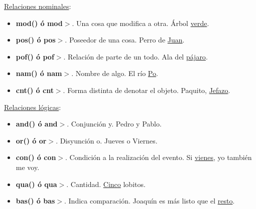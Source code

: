 \documentclass{article}
\begin{document}
\begin{multicols*}{3}
\underline{Relaciones nominales}:

\begin{itemize}[itemsep=0pt, parsep=0pt, leftmargin=1em]
    \item \textbf{mod() ó mod$>$}. Una cosa que modifica a otra. Árbol \underline{verde}.
    \item \textbf{pos() ó pos$>$}. Poseedor de una cosa. Perro de \underline{Juan}.
    \item \textbf{pof() ó pof$>$}. Relación de parte de un todo. Ala del \underline{pájaro}. 
    \item \textbf{nam() ó nam$>$}. Nombre de algo. El río \underline{Po}. 
    \item \textbf{cnt() ó cnt$>$}. Forma distinta de denotar el objeto. Paquito, \underline{Jefazo}.
\end{itemize}

\underline{Relaciones lógicas}:

\begin{itemize}[itemsep=0pt, parsep=0pt, leftmargin=1em]
    \item \textbf{and() ó and$>$}. Conjunción y. Pedro y Pablo.
    \item \textbf{or() ó or$>$}. Disyunción o. Jueves o Viernes.
    \item \textbf{con() ó con$>$}. Condición a la realización del evento. Si \underline{vienes}, yo también me voy.
    \item \textbf{qua() ó qua$>$}. Cantidad. \underline{Cinco} lobitos.
    \item \textbf{bas() ó bas$>$}. Indica comparación. Joaquín es más listo que el \underline{resto}.
\end{itemize}

\end{multicols*}
\end{document}
